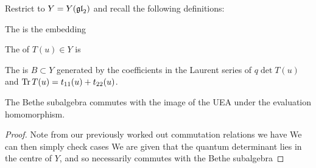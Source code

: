 \documentclass{article}
\begin{document}
Restrict to $Y = Y(\mathfrak{gl}_2)$ and recall the following definitions:

\begin{definition}
The  is the embedding 
\end{definition}

\begin{definition}
The  of $T(u) \in Y$ is 
\end{definition}

\begin{definition}
The  is $B \subset Y$ generated by the coefficients in the Laurent series of $q\det T(u) $ and $\operatorname{Tr} T(u) = t_{11}(u) + t_{22}(u)$.
\end{definition}

\begin{prop}
The Bethe subalgebra commutes with the image of the UEA under the evaluation homomorphism. 
\end{prop}
\begin{proof}
Note from our previously worked out commutation relations we have 
We can then simply check cases
We are given that the quantum determinant lies in the centre of $Y$, and so necessarily commutes with the Bethe subalgebra
\end{proof}
\end{document}
